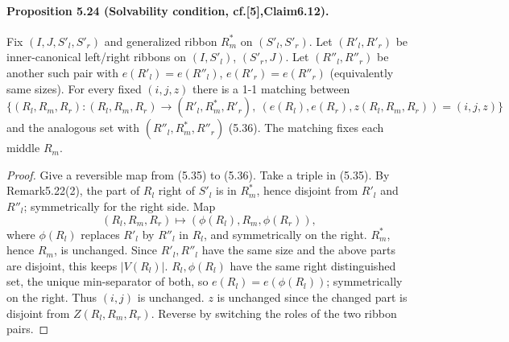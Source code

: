 \paragraph{Proposition 5.24 (Solvability condition, cf.[5],Claim6.12).} Fix $(I,J,S'_l,S'_r)$ and generalized ribbon $R^*_m$ on $(S'_l,S'_r)$. Let $(R'_l,R'_r)$ be inner-canonical left/right ribbons on $(I,S'_l)$, $(S'_r,J)$. Let $(R''_l,R''_r)$ be another such pair with $e(R'_l)=e(R''_l)$, $e(R'_r)=e(R''_r)$ (equivalently same sizes). For every fixed $(i,j,z)$ there is a 1-1 matching between
\[\{(R_l,R_m,R_r): (R_l,R_m,R_r)\to(R'_l,R^*_m,R'_r),\ (e(R_l),e(R_r),z(R_l,R_m,R_r))=(i,j,z)\}\tag{5.35}\]
and the analogous set with $(R''_l,R^*_m,R''_r)$ (5.36). The matching fixes each middle $R_m$.
\begin{proof}Give a reversible map from (5.35) to (5.36). Take a triple in (5.35). By Remark5.22(2), the part of $R_l$ right of $S'_l$ is in $R^*_m$, hence disjoint from $R'_l$ and $R''_l$; symmetrically for the right side. Map
\[(R_l,R_m,R_r)\mapsto(\phi(R_l),R_m,\phi(R_r)),\]
where $\phi(R_l)$ replaces $R'_l$ by $R''_l$ in $R_l$, and symmetrically on the right. $R^*_m$, hence $R_m$, is unchanged. Since $R'_l,R''_l$ have the same size and the above parts are disjoint, this keeps $|V(R_l)|$. $R_l,\phi(R_l)$ have the same right distinguished set, the unique min-separator of both, so $e(R_l)=e(\phi(R_l))$; symmetrically on the right. Thus $(i,j)$ is unchanged. $z$ is unchanged since the changed part is disjoint from $Z(R_l,R_m,R_r)$. Reverse by switching the roles of the two ribbon pairs.\end{proof}
